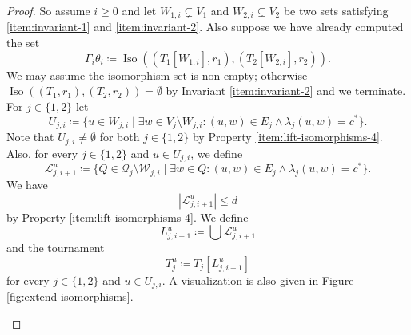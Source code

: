 \documentclass{theoretics}
\newcommand{\CL}{{\mathcal L}}
\newcommand{\CQ}{{\mathcal Q}}
\newcommand{\CW}{{\mathcal W}}
\DeclareMathOperator{\Iso}{Iso}
\begin{document}
\begin{proof}
 So assume $i \geq 0$ and let $W_{1,i} \subsetneq V_1$ and $W_{2,i} \subsetneq V_2$ be two sets satisfying \ref{item:invariant-1} and \ref{item:invariant-2}.
 Also suppose we have already computed the set
 \begin{equation}
  \label{eq:def-gamma-i}
  \Gamma_i\theta_i \coloneqq \Iso((T_1[W_{1,i}],r_1),(T_2[W_{2,i}],r_2)).
 \end{equation}
 We may assume the isomorphism set is non-empty; otherwise $\Iso((T_1,r_1),(T_2,r_2)) = \emptyset$ by Invariant \ref{item:invariant-2} and we terminate.
 For $j \in \{1,2\}$ let
 \[U_{j,i} \coloneqq \{u \in W_{j,i} \mid \exists w \in V_j \setminus W_{j,i} \colon (u,w) \in E_j \wedge \lambda_j(u,w) = c^*\}.\]
 Note that $U_{j,i} \neq \emptyset$ for both $j \in \{1,2\}$ by Property \ref{item:lift-isomorphisms-4}.
 Also, for every $j \in \{1,2\}$ and $u \in U_{j,i}$, we define
 \[\CL_{j,i+1}^{u} \coloneqq \{Q \in \CQ_j \setminus \CW_{j,i} \mid \exists w \in Q \colon (u,w) \in E_j \wedge \lambda_j(u,w) = c^*\}.\]
 We have
 \[|\CL_{j,i+1}^{u}| \leq d\]
 by Property \ref{item:lift-isomorphisms-4}.
 We define
 \[L_{j,i+1}^{u} \coloneqq \bigcup \CL_{j,i+1}^{u}\]
 and the tournament
 \[T_j^u \coloneqq T_j[L_{j,i+1}^{u}]\]
 for every $j \in \{1,2\}$ and $u \in U_{j,i}$.
 A visualization is also given in Figure \ref{fig:extend-isomorphisms}.

 \begin{figure}
  \centering
\end{figure}
\end{proof}
\end{document}

